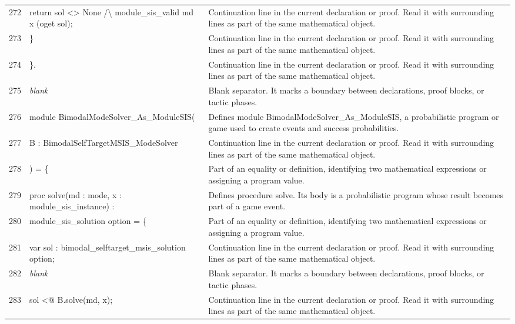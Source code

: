 \documentclass[10pt]{article}
\begin{document}
\begin{longtable}{r L{0.53\textwidth} L{0.37\textwidth}}
272 & {\ttfamily\scriptsize     return sol <> None /\textbackslash{} module\_sis\_valid md x (oget sol);} & Continuation line in the current declaration or proof.  Read it with surrounding lines as part of the same mathematical object. \\
273 & {\ttfamily\scriptsize   \}} & Continuation line in the current declaration or proof.  Read it with surrounding lines as part of the same mathematical object. \\
274 & {\ttfamily\scriptsize \}.} & Continuation line in the current declaration or proof.  Read it with surrounding lines as part of the same mathematical object. \\
275 & {\ttfamily\scriptsize \emph{blank}} & Blank separator.  It marks a boundary between declarations, proof blocks, or tactic phases. \\
276 & {\ttfamily\scriptsize module BimodalModeSolver\_As\_ModuleSIS(} & Defines module BimodalModeSolver\_As\_ModuleSIS, a probabilistic program or game used to create events and success probabilities. \\
277 & {\ttfamily\scriptsize   B : BimodalSelfTargetMSIS\_ModeSolver} & Continuation line in the current declaration or proof.  Read it with surrounding lines as part of the same mathematical object. \\
278 & {\ttfamily\scriptsize ) = \{} & Part of an equality or definition, identifying two mathematical expressions or assigning a program value. \\
279 & {\ttfamily\scriptsize   proc solve(md : mode, x : module\_sis\_instance) :} & Defines procedure solve.  Its body is a probabilistic program whose result becomes part of a game event. \\
280 & {\ttfamily\scriptsize     module\_sis\_solution option = \{} & Part of an equality or definition, identifying two mathematical expressions or assigning a program value. \\
281 & {\ttfamily\scriptsize     var sol : bimodal\_selftarget\_msis\_solution option;} & Continuation line in the current declaration or proof.  Read it with surrounding lines as part of the same mathematical object. \\
282 & {\ttfamily\scriptsize \emph{blank}} & Blank separator.  It marks a boundary between declarations, proof blocks, or tactic phases. \\
283 & {\ttfamily\scriptsize     sol <@ B.solve(md, x);} & Continuation line in the current declaration or proof.  Read it with surrounding lines as part of the same mathematical object. \\

\end{longtable}
\end{document}
